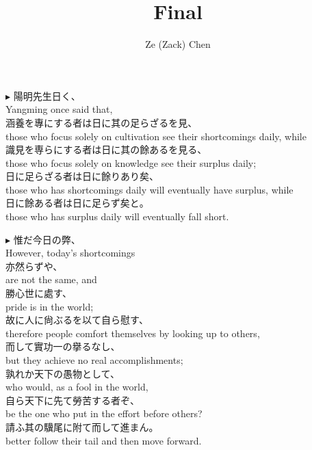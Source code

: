 \documentclass{ctexart}
\title{Final}
\author{Ze (Zack) Chen}
\makeatletter
\newcommand*{\shifttext}[1]{%
  \settowidth{\@tempdima}{#1}%
  \hspace{-\@tempdima}#1%
}
\newcommand{\plabel}[1]{%
\shifttext{\textbf{#1}\quad}%
}
\makeatother
\begin{document}
\maketitle

\plabel{$\blacktriangleright$}%
陽明先生日く、\\
Yangming once said that,\\
涵養を專にする者は日に其の足らざるを見、\\
those who focus solely on cultivation see their shortcomings daily, while\\
識見を専らにする者は日に其の餘あるを見る、\\
those who focus solely on knowledge see their surplus daily;\\
日に足らざる者は日に餘りあり矣、\\
those who has shortcomings daily will eventually have surplus, while\\
日に餘ある者は日に足らず矣と。\\
those who has surplus daily will eventually fall short.

\vspace{1em}
\plabel{$\blacktriangleright$}%
惟だ今日の弊、\\
However, today's shortcomings\\
亦然らずや、\\
are not the same, and\\
勝心世に處す、\\
pride is in the world;\\
故に人に尙ぶるを以て自ら慰す、\\
therefore people comfort themselves by looking up to others,\\
而して實功一の擧るなし、\\
but they achieve no real accomplishments;\\
孰れか天下の愚物として、\\
who would, as a fool in the world,\\
自ら天下に先て勞苦する者ぞ、\\
be the one who put in the effort before others?\\
請ふ其の驥尾に附て而して進まん。\\
better follow their tail and then move forward.
\end{document}
